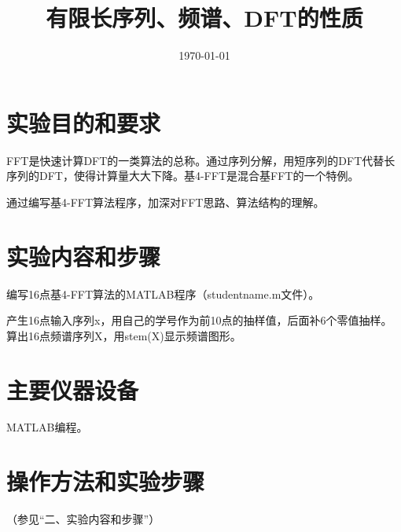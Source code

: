 \documentclass{../source/Experiment}
\title{有限长序列、频谱、DFT的性质}
\date{\today}
\begin{document}
    \makeheader
    \section{实验目的和要求}

    FFT是快速计算DFT的一类算法的总称。通过序列分解，用短序列的DFT代替长序列的DFT，使得计算量大大下降。基4-FFT是混合基FFT的一个特例。

    通过编写基4-FFT算法程序，加深对FFT思路、算法结构的理解。


    \section{实验内容和步骤}
    编写16点基4-FFT算法的MATLAB程序（studentname.m文件）。

    产生16点输入序列x，用自己的学号作为前10点的抽样值，后面补6个零值抽样。算出16点频谱序列X，用stem(X)显示频谱图形。

    \section{主要仪器设备}

    MATLAB编程。

    \section{操作方法和实验步骤}

    （参见“二、实验内容和步骤”）
\end{document}
